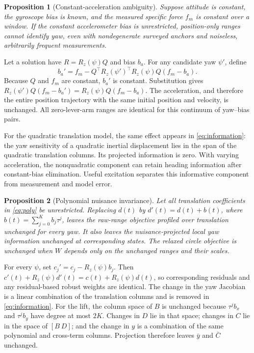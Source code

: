 \documentclass[conference,letterpaper,10pt]{IEEEtran}
\newtheorem{proposition}{Proposition}
\newcommand{\rz}{R_z}
\begin{document}
\begin{proposition}[Constant-acceleration ambiguity]
Suppose attitude is constant, the gyroscope bias is known, and the measured specific force $f_m$ is constant over a window. If the constant accelerometer bias is unrestricted, position-only ranges cannot identify yaw, even with nondegenerate surveyed anchors and noiseless, arbitrarily frequent measurements.
\end{proposition}
\begin{IEEEproof}
Let a solution have $R=\rz(\psi)Q$ and bias $b_a$. For any candidate yaw $\psi'$, define
\begin{equation}
 b_a'=f_m-Q^\top\rz(\psi')^\top\rz(\psi)Q(f_m-b_a).
 \label{eq:biasambiguity}
\end{equation}
Because $Q$ and $f_m$ are constant, $b_a'$ is constant. Substitution gives $\rz(\psi')Q(f_m-b_a')=\rz(\psi)Q(f_m-b_a)$. The acceleration, and therefore the entire position trajectory with the same initial position and velocity, is unchanged. All zero-lever-arm ranges are identical for this continuum of yaw--bias pairs.
\end{IEEEproof}

For the quadratic translation model, the same effect appears in \eqref{eq:information}: the yaw sensitivity of a quadratic inertial displacement lies in the span of the quadratic translation columns. Its projected information is zero. With varying acceleration, the nonquadratic component can retain heading information after constant-bias elimination. Useful excitation separates this informative component from measurement and model error.

\begin{proposition}[Polynomial nuisance invariance]
Let all translation coefficients in \eqref{eq:poly} be unrestricted. Replacing $d(t)$ by $d'(t)=d(t)+b(t)$, where $b(t)=\sum_{j=0}^{K}b_j\tau^j$, leaves the raw-range objective profiled over translation unchanged for every yaw. It also leaves the nuisance-projected local yaw information unchanged at corresponding states. The relaxed circle objective is unchanged when $W$ depends only on the unchanged ranges and their scales.
\end{proposition}
\begin{IEEEproof}
For every $\psi$, set $c_j'=c_j-\rz(\psi)b_j$. Then $c'(t)+\rz(\psi)d'(t)=c(t)+\rz(\psi)d(t)$, so corresponding residuals and any residual-based robust weights are identical. The change in the yaw Jacobian is a linear combination of the translation columns and is removed in \eqref{eq:information}. For the lift, the column space of $B$ is unchanged because $\tau^j b_x$ and $\tau^j b_y$ have degree at most $2K$. Changes in $D$ lie in that space; changes in $C$ lie in the space of $[B\ D]$; and the change in $y$ is a combination of the same polynomial and cross-term columns. Projection therefore leaves $\bar y$ and $\bar C$ unchanged.
\end{IEEEproof}
\end{document}

